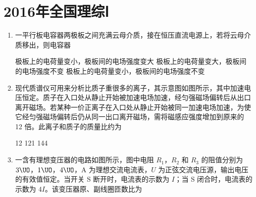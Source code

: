 \documentclass[\gkver]{gaokaozhenti}
\begin{document}
\chapter{2016年全国理综Ⅰ}

\begin{enumerate}
\item
一平行板电容器两极板之间充满云母介质，接在恒压直流电源上，若将云母介质移出，则电容器

{极板上的电荷量变小，极板间的电场强度变大}
{极板上的电荷量变大，极板间的电场强度不变}
{极板上的电荷量变小，极板间的电场强度不变}


\item
现代质谱仪可用来分析比质子重很多的离子，其示意图如图所示，其中加速电压恒定。质子在入口处从静止开始被加速电场加速，经匀强磁场偏转后从出口离开磁场。若某种一价正离子在入口处从静止开始被同一加速电场加速，为使它经匀强磁场偏转后仍从同一出口离开磁场，需将磁感应强度增加到原来的 12 倍。此离子和质子的质量比约为

\onepicture[w=5.00cm]{}

{12}
{121}
{144}


\item
一含有理想变压器的电路如图所示，图中电阻 $R_{1}$，$R_{2}$ 和 $R_{3}$ 的阻值分别为 $3\UO$，$1\UO$，$4\UO$，A 为理想交流电流表，$U$ 为正弦交流电压源，输出电压的有效值恒定。当开关 S 断开时，电流表的示数为 $I$；当 S 闭合时，电流表的示数为 $4I$。该变压器原、副线圈匝数比为


\end{enumerate}
\end{document}
